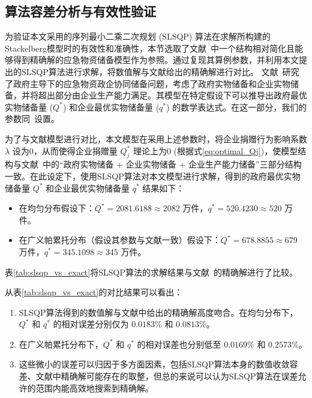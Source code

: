\documentclass[a4paper,8pt,twocolumn]{article} %
\begin{document}
\subsection{算法容差分析与有效性验证}
为验证本文采用的序列最小二乘二次规划 (SLSQP) 算法在求解所构建的Stackelberg模型时的有效性和准确性，本节选取了文献~\cite{LIY2023}中一个结构相对简化且能够得到精确解的应急物资储备模型作为参照。通过复现其算例参数，并利用本文提出的SLSQP算法进行求解，将数值解与文献给出的精确解进行对比。
文献~\cite{LIY2023}研究了政府主导下的应急物资政企协同储备问题，考虑了政府实物储备和企业实物储备，并将超出部分由企业生产能力满足。其模型在特定假设下可以推导出政府最优实物储备量 ($Q^*$) 和企业最优实物储备量 ($q^*$) 的数学表达式。在这一部分，我们的参数同~\cite{LIY2023}设置。

为了与文献模型进行对比，本文模型在采用上述参数时，将企业捐赠行为影响系数 $\lambda$ 设为0，从而使得企业捐赠量 $Q_j^*$ 理论上为0 (根据式\eqref{eq:optimal_Qj})，使模型结构与文献~\cite{LIY2023}中的“政府实物储备 + 企业实物储备 + 企业生产能力储备”三部分结构一致。在此设定下，使用SLSQP算法对本文模型进行求解，得到的政府最优实物储备量 $Q^*$ 和企业最优实物储备量 $q^*$ 结果如下：
\begin{itemize}
    \item 在均匀分布假设下：$Q^* = 2081.6188 \approx 2082$  万件，$q^* = 520.4230 \approx 520$ 万件。
    \item 在广义帕累托分布（假设其参数与文献一致）假设下：$Q^* = 678.8855 \approx 679$ 万件，$q^* = 345.1098 \approx 345$ 万件。
\end{itemize}

表\ref{tab:slsqp_vs_exact}将SLSQP算法的求解结果与文献~\cite{LIY2023}的精确解进行了比较。

从表\ref{tab:slsqp_vs_exact}的对比结果可以看出：
\begin{enumerate}
    \item SLSQP算法得到的数值解与文献中给出的精确解高度吻合。在均匀分布下，$Q^*$ 和 $q^*$ 的相对误差分别仅为 $0.0183\%$ 和 $0.0813\%$。
    \item 在广义帕累托分布下，$Q^*$ 和 $q^*$ 的相对误差也分别低至 $0.0169\%$ 和 $0.2573\%$。
    \item 这些微小的误差可以归因于多方面因素，包括SLSQP算法本身的数值收敛容差、文献中精确解可能存在的取整，但总的来说可以认为SLSQP算法在误差允许的范围内能高效地搜索到精确解。
\end{enumerate}
\end{document}
